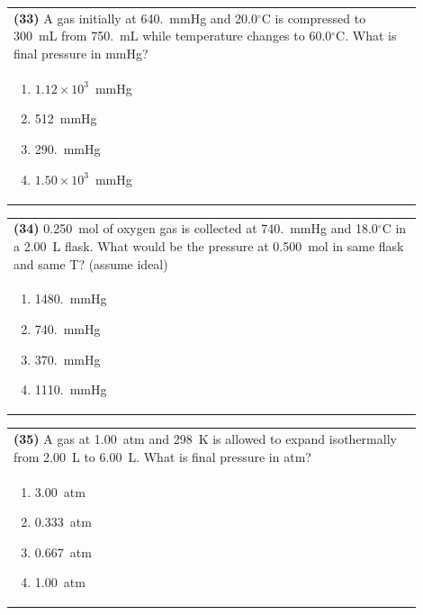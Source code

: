\documentclass{article}
\begin{document}
\newpage

\noindent\begin{tabular}{|p{0.9\linewidth}|}
\hline
\textbf{(33)} A gas initially at 640.~mmHg and 20.0$^\circ$C is compressed to 300~mL from 750.~mL while temperature changes to 60.0$^\circ$C. What is final pressure in mmHg?\\[0.2cm]

\begin{minipage}[t]{0.85\linewidth}
\begin{enumerate}[label=\alph*.]
\item $1.12\times10^{3}$~mmHg
\item 512~mmHg
\item 290.~mmHg
\item $1.50\times10^{3}$~mmHg
\end{enumerate}
\end{minipage}\\[0.2cm]
\hline
\end{tabular}

\vspace{0.2cm}
\noindent\begin{tabular}{|p{0.9\linewidth}|}
\hline
\textbf{(34)} 0.250~mol of oxygen gas is collected at 740.~mmHg and 18.0$^\circ$C in a 2.00~L flask. What would be the pressure at 0.500~mol in same flask and same T? (assume ideal)\\[0.2cm]

\begin{minipage}[t]{0.85\linewidth}
\begin{enumerate}[label=\alph*.]
\item 1480.~mmHg
\item 740.~mmHg
\item 370.~mmHg
\item 1110.~mmHg
\end{enumerate}
\end{minipage}\\[0.2cm]
\hline
\end{tabular}

\vspace{0.2cm}
\noindent\begin{tabular}{|p{0.9\linewidth}|}
\hline
\textbf{(35)} A gas at 1.00~atm and 298~K is allowed to expand isothermally from 2.00~L to 6.00~L. What is final pressure in atm?\\[0.2cm]

\begin{minipage}[t]{0.85\linewidth}
\begin{enumerate}[label=\alph*.]
\item 3.00~atm
\item 0.333~atm
\item 0.667~atm
\item 1.00~atm
\end{enumerate}
\end{minipage}\\[0.2cm]
\hline
\end{tabular}
\end{document}
